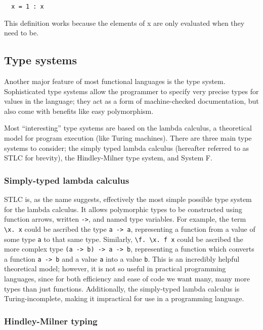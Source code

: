 \documentclass[9pt]{extarticle}
\begin{document}
\begin{verbatim}
  x = 1 : x 
\end{verbatim}

This definition works because the elements of x are only evaluated when they
need to be. 

\subsection{Type systems}

Another major feature of most functional languages is the type system.
Sophisticated type systems allow the programmer to specify very precise types
for values in the language; they act as a form of machine-checked documentation,
but also come with benefits like easy polymorphism.

Most ``interesting'' type systems are based on the lambda calculus, a theoretical
model for program execution (like Turing machines). There are three main type
systems to consider; the simply typed lambda calculus (hereafter referred to as
STLC for brevity), the Hindley-Milner type system, and System F.

\subsubsection{Simply-typed lambda calculus}

STLC is, as the name suggests, effectively the most simple possible type
system for the lambda calculus. It allows polymorphic types to be
constructed using function arrows, written \verb'->', and named type
variables. For example, the term \verb'\x. x' could be ascribed the type
\verb'a -> a', representing a function from a value of some type
\verb'a' to that same type. Similarly, \verb'\f. \x. f x' could be
ascribed the more complex type \verb'(a -> b) -> a -> b', representing a
function which converts a function \verb'a -> b' and a value \verb'a'
into a value \verb'b'. This is an incredibly helpful theoretical model;
however, it is not so useful in practical programming languages, since
for both efficiency and ease of code we want many, many more types than
just functions. Additionally, the simply-typed lambda calculus is
Turing-incomplete, making it impractical for use in a programming
language.

\subsubsection{Hindley-Milner typing}
\end{document}
